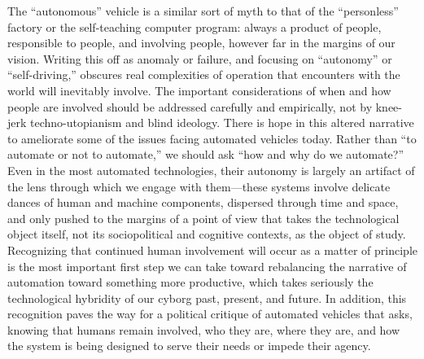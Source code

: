 The ``autonomous'' vehicle is a
similar sort of myth to that of the ``personless'' factory or the
self-teaching computer program: always a 
product of people, responsible to people, and involving people,
however far in the margins of our vision. Writing this off as
anomaly or failure, and focusing on ``autonomy'' or ``self-driving,''
obscures real complexities of operation that encounters with the world
will inevitably involve. The important considerations of when and how 
people are involved should be addressed carefully and
empirically, not by knee-jerk techno-utopianism and blind ideology.
There is hope in this altered narrative to ameliorate some of
the issues facing automated vehicles today. 
Rather than ``to automate or not to automate,'' we should ask
``how and why do we automate?'' Even in the most automated
technologies, their 
autonomy is largely an artifact of the lens through which we engage
with them---these systems involve delicate dances of human and machine
components, dispersed through time and space, and only pushed to the
margins of a point of view that takes the technological object itself,
not its sociopolitical and cognitive contexts, as the object of study.
Recognizing that continued human involvement will occur as a matter of
principle is 
the most important first step we can take toward rebalancing the
narrative of automation toward something more productive, which takes
seriously the technological hybridity of our cyborg past, present, and future.
In addition, this recognition paves the way for a political critique
of automated vehicles 
that asks, knowing 
that humans remain involved, who they are, where they are, and how
the system is being designed to serve their needs or impede their
agency.


